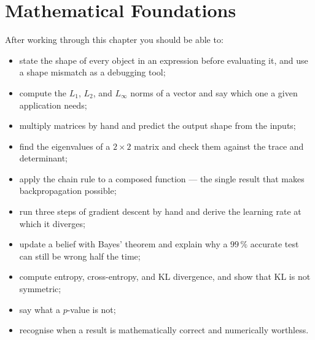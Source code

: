 
\chapter{Mathematical Foundations}
\label{ch:mathematical-foundations}


\begin{learningobjectives}
After working through this chapter you should be able to:
\begin{itemize}
  \item state the shape of every object in an expression before evaluating it,
        and use a shape mismatch as a debugging tool;
  \item compute the $L_1$, $L_2$, and $L_\infty$ norms of a vector and say which
        one a given application needs;
  \item multiply matrices by hand and predict the output shape from the inputs;
  \item find the eigenvalues of a $2\times2$ matrix and check them against the
        trace and determinant;
  \item apply the chain rule to a composed function --- the single result that
        makes backpropagation possible;
  \item run three steps of gradient descent by hand and derive the learning
        rate at which it diverges;
  \item update a belief with Bayes' theorem and explain why a $99\,\%$ accurate
        test can still be wrong half the time;
  \item compute entropy, cross-entropy, and KL divergence, and show that KL is
        not symmetric;
  \item say what a $p$-value is not;
  \item recognise when a result is mathematically correct and numerically
        worthless.
\end{itemize}
\end{learningobjectives}

